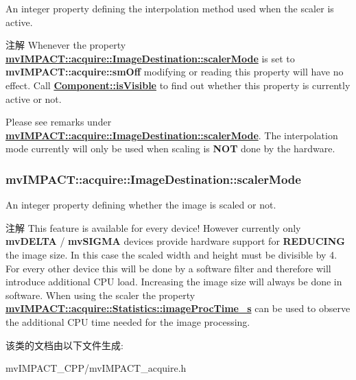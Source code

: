 An integer property defining the interpolation method used when the scaler is active. 

\begin{DoxyNote}{注解}
Whenever the property {\bfseries \hyperlink{classmv_i_m_p_a_c_t_1_1acquire_1_1_image_destination_a0e85ee4b320d7b84f664d00d02965c73}{mv\+I\+M\+P\+A\+C\+T\+::acquire\+::\+Image\+Destination\+::scaler\+Mode}} is set to {\bfseries mv\+I\+M\+P\+A\+C\+T\+::acquire\+::sm\+Off} modifying or reading this property will have no effect. Call {\bfseries \hyperlink{classmv_i_m_p_a_c_t_1_1acquire_1_1_component_ae9f95ac45440af06f7d36990ad633a73}{Component\+::is\+Visible}} to find out whether this property is currently active or not.

Please see remarks under {\bfseries \hyperlink{classmv_i_m_p_a_c_t_1_1acquire_1_1_image_destination_a0e85ee4b320d7b84f664d00d02965c73}{mv\+I\+M\+P\+A\+C\+T\+::acquire\+::\+Image\+Destination\+::scaler\+Mode}}. The interpolation mode currently will only be used when scaling is {\bfseries N\+O\+T} done by the hardware. 
\end{DoxyNote}
\hypertarget{classmv_i_m_p_a_c_t_1_1acquire_1_1_image_destination_a0e85ee4b320d7b84f664d00d02965c73}{
\subsubsection[{scaler\+Mode}]{ mv\+I\+M\+P\+A\+C\+T\+::acquire\+::\+Image\+Destination\+::scaler\+Mode}}\label{classmv_i_m_p_a_c_t_1_1acquire_1_1_image_destination_a0e85ee4b320d7b84f664d00d02965c73}


An integer property defining whether the image is scaled or not. 

\begin{DoxyNote}{注解}
This feature is available for every device! However currently only {\bfseries mv\+D\+E\+L\+T\+A} / {\bfseries mv\+S\+I\+G\+M\+A} devices provide hardware support for {\bfseries R\+E\+D\+U\+C\+I\+N\+G} the image size. In this case the scaled width and height must be divisible by 4. For every other device this will be done by a software filter and therefore will introduce additional C\+P\+U load. Increasing the image size will always be done in software. When using the scaler the property {\bfseries \hyperlink{classmv_i_m_p_a_c_t_1_1acquire_1_1_statistics_ac65c579e00cb51b5c841b6730631fe7e}{mv\+I\+M\+P\+A\+C\+T\+::acquire\+::\+Statistics\+::image\+Proc\+Time\+\_\+s}} can be used to observe the additional C\+P\+U time needed for the image processing. 
\end{DoxyNote}


该类的文档由以下文件生成\+:\begin{DoxyCompactItemize}
\item 
mv\+I\+M\+P\+A\+C\+T\+\_\+\+C\+P\+P/mv\+I\+M\+P\+A\+C\+T\+\_\+acquire.\+h\end{DoxyCompactItemize}
